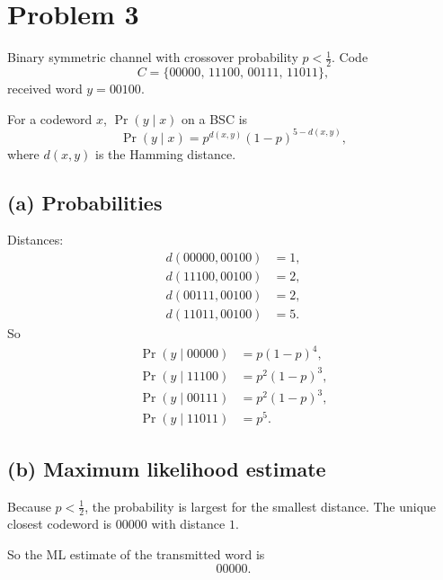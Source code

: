 \section*{Problem 3}

Binary symmetric channel with crossover probability \(p<\tfrac12\).
Code
\[
C=\{00000,\,11100,\,00111,\,11011\},
\]
received word \(y=00100\).

For a codeword \(x\), \(\Pr(y\mid x)\) on a BSC is
\[
\Pr(y\mid x)=p^{d(x,y)}(1-p)^{5-d(x,y)},
\]
where \(d(x,y)\) is the Hamming distance.

\subsection*{(a) Probabilities}

Distances:
\[
\begin{aligned}
d(00000,00100)&=1,\\
d(11100,00100)&=2,\\
d(00111,00100)&=2,\\
d(11011,00100)&=5.
\end{aligned}
\]
So
\[
\begin{aligned}
\Pr(y\mid 00000)&=p(1-p)^4,\\
\Pr(y\mid 11100)&=p^2(1-p)^3,\\
\Pr(y\mid 00111)&=p^2(1-p)^3,\\
\Pr(y\mid 11011)&=p^5.
\end{aligned}
\]

\subsection*{(b) Maximum likelihood estimate}

Because \(p<\tfrac12\), the probability is largest for the smallest distance.  
The unique closest codeword is \(00000\) with distance \(1\).  

So the ML estimate of the transmitted word is
\[
\boxed{00000}.
\]
